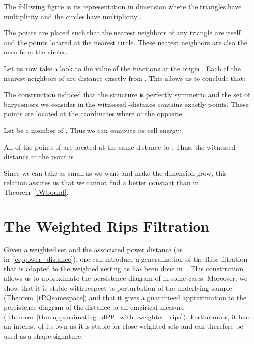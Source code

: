 \documentclass[a4paper]{article}
\begin{document}
The following figure is its representation in dimension  where the triangles have multiplicity  and the circles have multiplicity .
\begin{center}
\end{center}
The points are placed such that the  nearest neighbors of any triangle are itself and the  points located at the nearest circle.
These  nearest neighbors are also the ones from the circles.

Let us now take a look to the value of the functions at the origin .
Each of the  nearest neighbors of  are distance exactly  from .
This allows us to conclude that: 

The construction induced that the structure is perfectly symmetric and the set of barycenters  we consider in the witnessed -distance contains exactly  points.
These points are located at the coordinates  where  or the opposite. 

Let  be a member of .
Thus we can compute its cell energy: 


All of the points of  are located at the same distance to .
Thus, the witnessed -distance at the point  is


Since we can take  as small as we want and make the dimension grow, this relation assures us that we cannot find a better constant than  in Theorem~\ref{tWbound}.



\section{The Weighted Rips Filtration} \label{sWRips}

 Given a weighted set  and the associated power distance  (as in~\eqref{eq:power_distance}), one can introduce a generalization of the Rips filtration that is adapted to the weighted setting as has been done in~\cite{wkdGMM}.
  This construction allows us to approximate the persistence diagram of  in some cases. 
  Moreover, we show that it is stable with respect to perturbation of the underlying sample (Theorem~\ref{tPQsamespace}) and that it gives a guaranteed approximation to the persistence diagram of the distance to an empirical measure (Theorem~\ref{thm:approximating_dPP_with_weighted_rips}). 
Furthermore, it has an interest of its own as it is stable for close weighted sets and can therefore be used as a shape signature.
\end{document}

